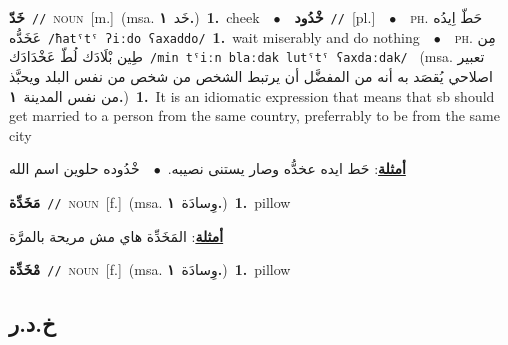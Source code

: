 \documentclass[10pt,a4paper,twoside]{article} %
\begin{document}
\begin{multicols}{2}
{{{{{{{\setlength\topsep{0pt}\textbf{\foreignlanguage{arabic}{خَدّ}}\ {\color{gray}\texttt{//}\color{black}}\ \textsc{noun}\ [m.]\ \color{gray}(msa. \foreignlanguage{arabic}{خَد}~\foreignlanguage{arabic}{\textbf{١.}})\color{black}\ \textbf{1.}~cheek\ \ $\bullet$\ \ \setlength\topsep{0pt}\textbf{\foreignlanguage{arabic}{خْدُود}}\ {\color{gray}\texttt{//}\color{black}}\ [pl.]\ \ $\bullet$\ \ \textsc{ph.} \color{gray} \foreignlanguage{arabic}{حَطّ اِيدُه عَخَدُّه}\color{black}\ {\color{gray}\texttt{/{\sffamily ħatˤtˤ ʔiːdo ʕaxaddo}/}\color{black}}\ \textbf{1.}~wait miserably and do nothing\ \ $\bullet$\ \ \textsc{ph.} \color{gray} \foreignlanguage{arabic}{مِن طِين بْلَادَك لُطّ عَخْدَادَك}\color{black}\ {\color{gray}\texttt{/{\sffamily min tˤiːn blaːdak lutˤtˤ ʕaxdaːdak}/}\color{black}}\ \color{gray} (msa. \foreignlanguage{arabic}{تعبير اصلاحي يُقصَد به أنه من المفضَّل أن يرتبط الشخص من شخص من نفس البلد ويحبَّذ من نفس المدينة}~\foreignlanguage{arabic}{\textbf{١.}})\color{black}\ \textbf{1.}~It is an idiomatic expression that means  that sb should get married to a person from the same country, preferrably to be from the same city\  \begin{flushright}\color{gray}\foreignlanguage{arabic}{\textbf{\underline{\foreignlanguage{arabic}{أمثلة}}}: حَط ايده عخدُّه وصار يستنى نصيبه.\ $\bullet$\ \  خْدُوده حلوين اسم الله}\end{flushright}\color{black}} \vspace{2mm}

{\setlength\topsep{0pt}\textbf{\foreignlanguage{arabic}{مَخَدِّة}}\ {\color{gray}\texttt{//}\color{black}}\ \textsc{noun}\ [f.]\ \color{gray}(msa. \foreignlanguage{arabic}{وِسادَة}~\foreignlanguage{arabic}{\textbf{١.}})\color{black}\ \textbf{1.}~pillow\  \begin{flushright}\color{gray}\foreignlanguage{arabic}{\textbf{\underline{\foreignlanguage{arabic}{أمثلة}}}: المَخَدِّة هاي مش مريحة بالمرَّة}\end{flushright}\color{black}} \vspace{2mm}

{\setlength\topsep{0pt}\textbf{\foreignlanguage{arabic}{مْخَدِّة}}\ {\color{gray}\texttt{//}\color{black}}\ \textsc{noun}\ [f.]\ \color{gray}(msa. \foreignlanguage{arabic}{وِسادَة}~\foreignlanguage{arabic}{\textbf{١.}})\color{black}\ \textbf{1.}~pillow\ 

\vspace{-3mm}
\subsection*{\color{blue}\foreignlanguage{arabic}{خ.د.ر}\color{blue}{}} 

}}}}}}}
\end{multicols}
\end{document}
